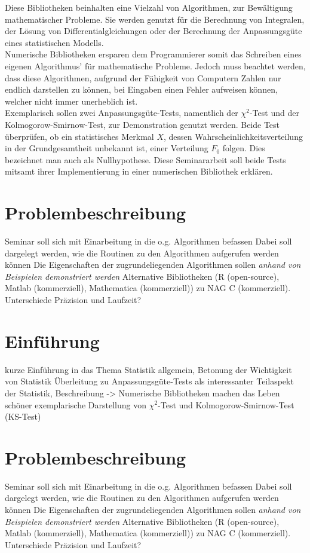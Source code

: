 \documentclass{article}
\begin{document}
Diese Bibliotheken beinhalten eine Vielzahl von Algorithmen, zur Bewältigung mathematischer Probleme. Sie werden genutzt für die Berechnung von Integralen, der Lösung von Differentialgleichungen oder der Berechnung der Anpassungsgüte eines statistischen Modells.\\
Numerische Bibliotheken ersparen dem Programmierer somit das Schreiben eines eigenen Algorithmus' für mathematische Probleme. Jedoch muss beachtet werden, dass diese Algorithmen, aufgrund der Fähigkeit von Computern Zahlen nur endlich darstellen zu können, bei Eingaben einen Fehler aufweisen können, welcher nicht immer unerheblich ist.\\
Exemplarisch sollen zwei Anpassungsgüte-Tests, namentlich der $\chi^2$-Test und der Kolmogorow-Smirnow-Test, zur Demonstration genutzt werden.
Beide Test überprüfen, ob ein statistisches Merkmal $X$, dessen Wahrscheinlichkeitsverteilung in der Grundgesamtheit unbekannt ist, einer Verteilung $F_0$ folgen. Dies bezeichnet man auch als Nullhypothese.
Diese Seminararbeit soll beide Tests mitsamt ihrer Implementierung in einer numerischen Bibliothek erklären.

\newpage
\section{Problembeschreibung}
Seminar soll sich mit Einarbeitung in die o.g. Algorithmen befassen
Dabei soll dargelegt werden, wie die Routinen zu den Algorithmen aufgerufen werden können
Die Eigenschaften der zugrundeliegenden Algorithmen sollen \emph{anhand von Beispielen demonstriert werden}
Alternative Bibliotheken (R (open-source), Matlab (kommerziell), Mathematica (kommerziell)) zu NAG C (kommerziell).
Unterschiede Präzision und Laufzeit?

\newpage
\section{Einführung}
kurze Einführung in das Thema Statistik allgemein, Betonung der Wichtigkeit von Statistik
Überleitung zu Anpassungsgüte-Tests als interessanter Teilaspekt der Statistik, Beschreibung
-> Numerische Bibliotheken machen das Leben schöner
exemplarische Darstellung von $\chi^2$-Test und Kolmogorow-Smirnow-Test (KS-Test)

\section{Problembeschreibung}
Seminar soll sich mit Einarbeitung in die o.g. Algorithmen befassen
Dabei soll dargelegt werden, wie die Routinen zu den Algorithmen aufgerufen werden können
Die Eigenschaften der zugrundeliegenden Algorithmen sollen \emph{anhand von Beispielen demonstriert werden}
Alternative Bibliotheken (R (open-source), Matlab (kommerziell), Mathematica (kommerziell)) zu NAG C (kommerziell).
Unterschiede Präzision und Laufzeit?
\end{document}
